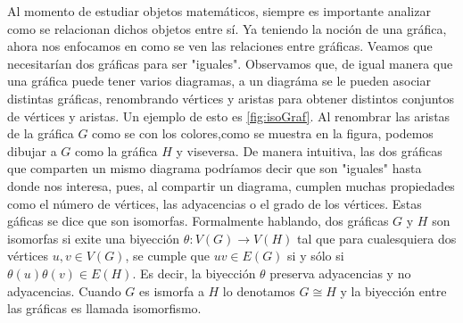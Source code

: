 Al momento de estudiar objetos matem\'aticos, siempre es importante analizar
como se relacionan dichos objetos entre s\'i. Ya teniendo la noci\'on de una
gr\'afica, ahora nos enfocamos en como se ven las relaciones entre gr\'aficas.
Veamos que necesitar\'ian dos gr\'aficas para ser "iguales". Observamos
que, de igual manera que una gr\'afica puede tener varios diagramas, a un
diagr\'ama se le pueden asociar distintas gr\'aficas, renombrando v\'ertices y
aristas para obtener distintos conjuntos de v\'ertices y aristas. Un ejemplo de
esto es \cref{fig:isoGraf}. Al renombrar las aristas de la gr\'afica $G$ como se
con los colores,como se muestra en la figura, podemos dibujar a $G$ como la gr\'afica
$H$ y viseversa. De manera intuitiva, las dos gr\'aficas que comparten un mismo
diagrama podr\'iamos decir que son "iguales" hasta donde nos interesa, pues, al
compartir un diagrama, cumplen muchas propiedades como el n\'umero de
v\'ertices, las adyacencias o el grado de los v\'ertices. Estas g\'aficas se
dice que son isomorfas. Formalmente hablando, dos gr\'aficas $G$ y $H$ son
isomorfas si exite una biyecci\'on $\theta: V(G) \rightarrow V(H)$ tal que para
cualesquiera dos v\'ertices $u, v \in V(G)$, se cumple que $uv \in E(G)$ si y
s\'olo si $\theta(u)\theta(v) \in E(H)$. Es decir, la biyecci\'on $\theta$
preserva adyacencias y no adyacencias. Cuando $G$ es ismorfa a $H$ lo denotamos
$G \cong H$ y la biyecci\'on entre las gr\'aficas es llamada isomorfismo.

